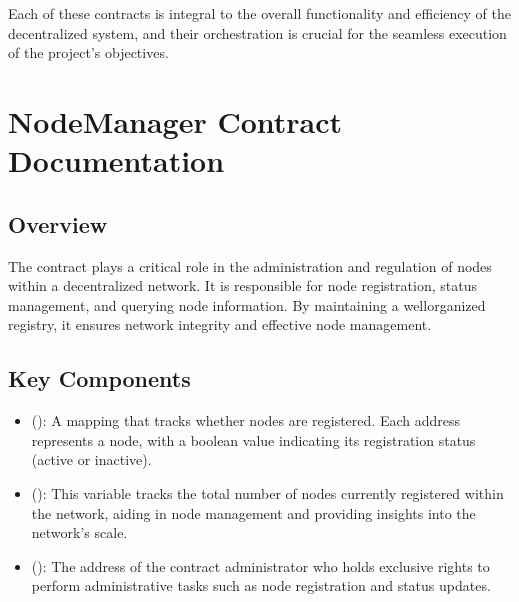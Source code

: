 \documentclass[a4paper,10pt,english]{sphinxmanual}
\let\sphinxpxdimen\pdfpxdimen\else\newdimen\sphinxpxdimen
\begin{document}
\noindent{\hspace*{\fill}\sphinxincludegraphics[width=600\sphinxpxdimen]{{architecture-image}.png}\hspace*{\fill}}

\sphinxAtStartPar
Each of these contracts is integral to the overall functionality and efficiency of the decentralized system, and their orchestration is crucial for the seamless execution of the project’s objectives.

\sphinxstepscope


\chapter{NodeManager Contract Documentation}
\label{\detokenize{docs_node_manager_contract:nodemanager-contract-documentation}}\label{\detokenize{docs_node_manager_contract::doc}}

\section{Overview}
\label{\detokenize{docs_node_manager_contract:overview}}
\sphinxAtStartPar
The  contract plays a critical role in the administration and regulation of nodes within a decentralized network. It is responsible for node registration, status management, and querying node information. By maintaining a well\sphinxhyphen{}organized registry, it ensures network integrity and effective node management.


\section{Key Components}
\label{\detokenize{docs_node_manager_contract:key-components}}
\sphinxAtStartPar
{}
\begin{itemize}
\item {} 
\sphinxAtStartPar
{} ():
A mapping that tracks whether nodes are registered. Each address represents a node, with a boolean value indicating its registration status (active or inactive).

\item {} 
\sphinxAtStartPar
{} ():
This variable tracks the total number of nodes currently registered within the network, aiding in node management and providing insights into the network’s scale.

\item {} 
\sphinxAtStartPar
{} ():
The address of the contract administrator who holds exclusive rights to perform administrative tasks such as node registration and status updates.

\end{itemize}
\end{document}
